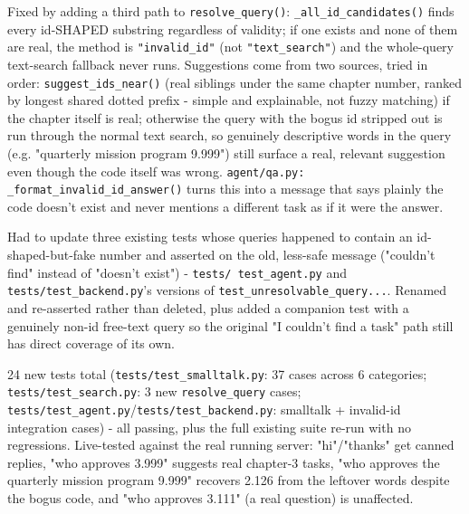 Fixed by adding a third path to \texttt{resolve\_\allowbreak{}query()}: \texttt{\_\allowbreak{}all\_\allowbreak{}id\_\allowbreak{}candidates()} finds every id-SHAPED substring regardless of validity; if one exists and none of them are real, the method is \texttt{"invalid\_\allowbreak{}id"} (not \texttt{"text\_\allowbreak{}search"}) and the whole-query text-search fallback never runs. Suggestions come from two sources, tried in order: \texttt{suggest\_\allowbreak{}ids\_\allowbreak{}near()} (real siblings under the same chapter number, ranked by longest shared dotted prefix - simple and explainable, not fuzzy matching) if the chapter itself is real; otherwise the query with the bogus id stripped out is run through the normal text search, so genuinely descriptive words in the query (e.g. "quarterly mission program 9.999") still surface a real, relevant suggestion even though the code itself was wrong. \texttt{agent/\allowbreak{}qa.py: \_\allowbreak{}format\_\allowbreak{}invalid\_\allowbreak{}id\_\allowbreak{}answer()} turns this into a message that says plainly the code doesn't exist and never mentions a different task as if it were the answer.

Had to update three existing tests whose queries happened to contain an id-shaped-but-fake number and asserted on the old, less-safe message ("couldn't find" instead of "doesn't exist") - \texttt{tests/\allowbreak{} test\_\allowbreak{}agent.py} and \texttt{tests/\allowbreak{}test\_\allowbreak{}backend.py}'s versions of \texttt{test\_\allowbreak{}unresolvable\_\allowbreak{}query...}. Renamed and re-asserted rather than deleted, plus added a companion test with a genuinely non-id free-text query so the original "I couldn't find a task" path still has direct coverage of its own.

24 new tests total (\texttt{tests/\allowbreak{}test\_\allowbreak{}smalltalk.py}: 37 cases across 6 categories; \texttt{tests/\allowbreak{}test\_\allowbreak{}search.py}: 3 new \texttt{resolve\_\allowbreak{}query} cases; \texttt{tests/\allowbreak{}test\_\allowbreak{}agent.py}/\texttt{tests/\allowbreak{}test\_\allowbreak{}backend.py}: smalltalk + invalid-id integration cases) - all passing, plus the full existing suite re-run with no regressions. Live-tested against the real running server: "hi"/"thanks" get canned replies, "who approves 3.999" suggests real chapter-3 tasks, "who approves the quarterly mission program 9.999" recovers 2.126 from the leftover words despite the bogus code, and "who approves 3.111" (a real question) is unaffected.

